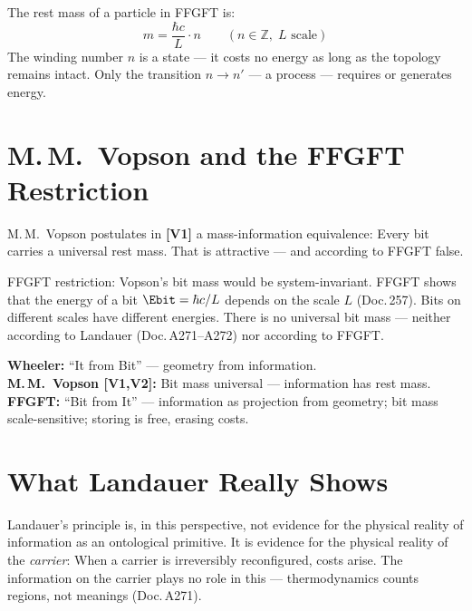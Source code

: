 The rest mass of a particle in FFGFT is:
\[
  m = \frac{\hbar c}{L} \cdot n \qquad (n \in \mathbb{Z},\; L \text{ scale})
\]
The winding number $n$ is a state --- it costs no energy as long as
the topology remains intact. Only the transition $n \to n'$ --- a process ---
requires or generates energy.

\section{M.\,M.~Vopson and the FFGFT Restriction}

M.\,M.~Vopson postulates in \textbf{[V1]} a mass-information equivalence: Every bit
carries a universal rest mass. That is attractive --- and according to FFGFT false.

FFGFT restriction: Vopson's bit mass would be system-invariant. FFGFT shows
that the energy of a bit $\Ebit = \hbar c / L$ depends on the scale $L$
(Doc.\,257). Bits on different scales have different energies.
There is no universal bit mass --- neither according to Landauer (Doc.\,A271--A272)
nor according to FFGFT.

\begin{ffgftbox}
\textbf{Wheeler:} ``It from Bit'' --- geometry from information.\\
\textbf{M.\,M.~Vopson \textbf{[V1,V2]}:} Bit mass universal --- information has rest mass.\\
\textbf{FFGFT:} ``Bit from It'' --- information as projection from geometry;
bit mass scale-sensitive; storing is free, erasing costs.
\end{ffgftbox}

\section{What Landauer Really Shows}

Landauer's principle is, in this perspective, not evidence for the
physical reality of information as an ontological primitive.
It is evidence for the physical reality of the \emph{carrier}:
When a carrier is irreversibly reconfigured, costs arise.
The information on the carrier plays no role in this ---
thermodynamics counts regions, not meanings (Doc.\,A271).